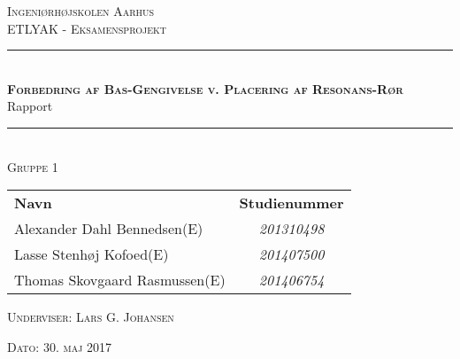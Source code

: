 \newcommand{\HRule}{\rule{\linewidth}{0.1mm}} %

\thispagestyle{empty}
\begin{center}
	\textsc{\LARGE Ingeniørhøjskolen Aarhus}\\[1.5cm] %

	
	\textsc{\large ETLYAK - Eksamensprojekt}\\[2.5cm] 
	\HRule \\[0.8cm]
	{\huge \bfseries \textsc{Forbedring af Bas-Gengivelse v. Placering af Resonans-Rør}} \\[0.5cm]{\LARGE Rapport} \\[0.4cm]
	\HRule \\[1.5cm]
	
	\textsc{\large Gruppe 1}\\
	\vspace{0.5 in}
	\begin{center}
		\begin{tabular}{l c}
			\textbf{Navn} & \textbf{Studienummer} \\
			Alexander Dahl Bennedsen(E) & \textsl{201310498}    \\
			Lasse Stenhøj Kofoed(E) & \textsl{201407500}  \\
			Thomas Skovgaard Rasmussen(E) & \textsl{201406754}
			
			
		\end{tabular}
	\end{center}
	\vspace{0.5 in}
	
	\textsc{\large Underviser: Lars G. Johansen}
	\vspace{0.5 in}
	
	\textsc{\large Dato: 30. maj 2017}\\
	
\end{center} %

\newpage